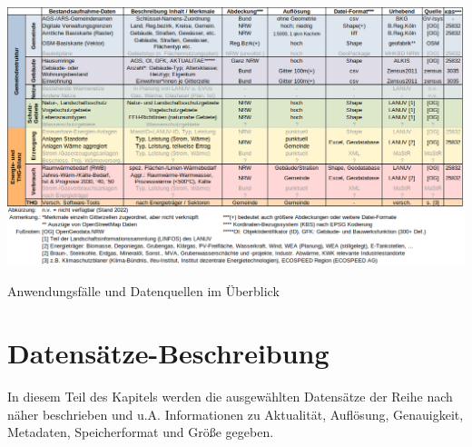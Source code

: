 			\begin{table}[H]
				\includegraphics[width=1.00\textwidth]{Medien/tables/Datengrundlage_Ueberblick.png}
				\caption{Anwendungsfälle und Datenquellen im Überblick}
				\label{tab:Datengrundlage_Überblick}
			\end{table}
		
		
					
			
			
	
	\section{Datensätze-Beschreibung}
	\label{sec:Daten:Datensatz}
		
		
		In diesem Teil des Kapitels werden die ausgewählten Datensätze der Reihe nach näher beschrieben und u.A. Informationen zu Aktualität, Auflösung, Genauigkeit, Metadaten, Speicherformat und Größe gegeben. 
		
